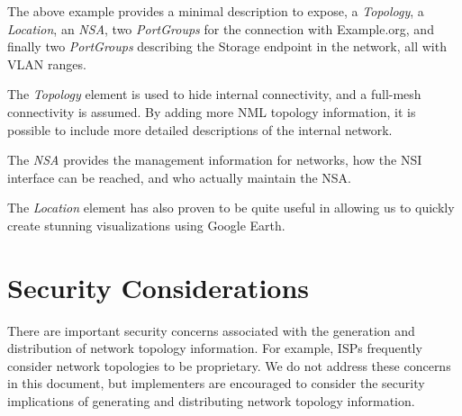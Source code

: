 \documentclass[12pt]{article}  %
\begin{document}
 The above example provides a minimal description to expose, 
a \emph{Topology}, a \emph{Location}, an \emph{NSA}, two \emph{PortGroups} for the connection with Example.org, 
and finally two \emph{PortGroups} describing the Storage endpoint in the network, all 
with VLAN ranges.

 The \emph{Topology} element is used to hide internal connectivity, and 
a full-mesh connectivity is assumed. By adding more NML topology information, it is possible 
to include more detailed descriptions of the internal network.


 The \emph{NSA} provides the management information for networks, how 
the NSI interface can be reached, and who actually maintain the NSA.

 The \emph{Location} element has also proven to be quite useful in allowing 
us to quickly create stunning visualizations using Google Earth.


% 
% 
% 
% 

\section{Security Considerations} %
\label{sec:security_considerations}


There are important security concerns associated with the generation and distribution of network topology information. For example, ISPs frequently consider network topologies to be proprietary. We do not address these concerns in this document, but implementers are encouraged to consider the security implications of generating and distributing network topology information. 
\end{document}
